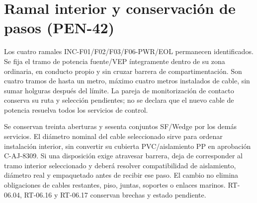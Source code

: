 \section{Ramal interior y conservación de pasos (PEN-42)}
\label{sec:sd4-pen42}
Los cuatro ramales INC-F01/F02/F03/F06-PWR/EOL permanecen identificados. Se fija el tramo de potencia fuente/VEP íntegramente dentro de su zona ordinaria, en conducto propio y sin cruzar barrera de compartimentación. Son cuatro tramos de hasta un metro, máximo cuatro metros instalados de cable, sin sumar holguras después del límite. La pareja de monitorización de contacto conserva su ruta y selección pendientes; no se declara que el nuevo cable de potencia resuelva todos los servicios de control.

Se conservan treinta aberturas y sesenta conjuntos SF/Wedge por los demás servicios. El diámetro nominal del cable seleccionado sirve para ordenar instalación interior, sin convertir su cubierta PVC/aislamiento PP en aprobación C-AJ-8309. Si una disposición exige atravesar barrera, deja de corresponder al tramo interior seleccionado y deberá resolver compatibilidad de aislamiento, diámetro real y empaquetado antes de recibir ese paso. El cambio no elimina obligaciones de cables restantes, piso, juntas, soportes o enlaces marinos. RT-06.04, RT-06.16 y RT-06.17 conservan brechas y estado pendiente.
